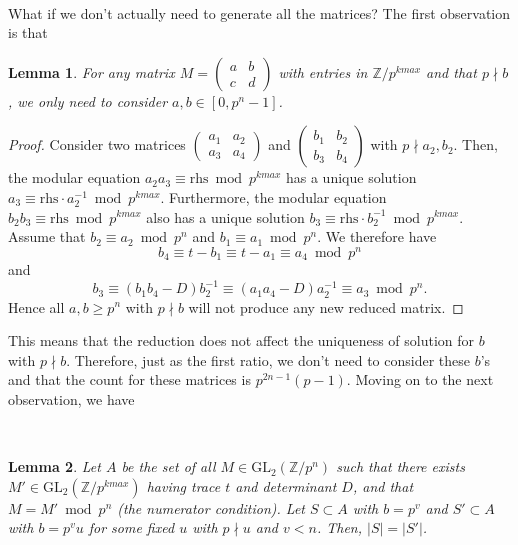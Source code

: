 \documentclass[letterpaper,12pt]{article}
\newtheorem{lemma}{Lemma}
\newcommand{\Z}{\mathbb{Z}}
\begin{document}
\

What if we don't actually need to generate all the matrices?
The first observation is that 
\begin{lemma}
For any matrix $M = \begin{pmatrix} a & b \\ c & d \end{pmatrix}$
with entries in $\Z/p^{kmax}$ and that
$p \nmid b$, we only need to consider $a, b \in [0, p^n-1]$.
\end{lemma}
\begin{proof}
Consider two matrices $\begin{pmatrix} a_1 & a_2 \\ a_3 & a_4 \end{pmatrix}$ and
$\begin{pmatrix} b_1 & b_2 \\ b_3 & b_4 \end{pmatrix}$
with $p \nmid a_2, b_2$.
Then, the modular equation $a_2a_3 \equiv \text{rhs} \bmod p^{kmax}$ has a unique solution 
$a_3 \equiv \text{rhs} \cdot a_2^{-1} \bmod p^{kmax}$.
Furthermore, the modular equation $b_2b_3 \equiv \text{rhs} \bmod p^{kmax}$
also has a unique solution $b_3 \equiv \text{rhs} \cdot b_2^{-1} \bmod p^{kmax}$.
Assume that $b_2 \equiv a_2 \bmod p^n$ and $b_1 \equiv a_1 \bmod p^n$.
We therefore have
\[
b_4 \equiv t-b_1 \equiv t-a_1 \equiv a_4 \bmod p^n
\] 
and
\[
b_3 \equiv (b_1b_4 - D)b_2^{-1} 
\equiv (a_1a_4 - D)a_2^{-1} 
\equiv a_3 \bmod p^n.
\]
Hence all $a,b \geq p^n$ with $p \nmid b$ will not 
produce any new reduced matrix.
\end{proof}

This means that the reduction does not affect the uniqueness of solution 
for $b$ with $p \nmid b$.
Therefore, just as the first ratio, we don't need to consider these $b$'s
and that the count for these matrices is $p^{2n-1}(p-1)$.
Moving on to the next observation, we have

\

\begin{lemma}
Let $A$ be the set of all $M \in \text{GL}_2(\Z/p^n)$ 
such that there exists $M' \in \text{GL}_2(\Z/p^{kmax})$ having 
trace $t$ and determinant $D$, and that $M = M' \bmod p^n$
(the numerator condition).
Let $S \subset A$ with $b = p^v$ and
$S' \subset A$ with $b = p^vu$ for some fixed $u$ with $p \nmid u$
and $v < n$.
Then, $|S| = |S'|$.
\end{lemma}
\end{document}
